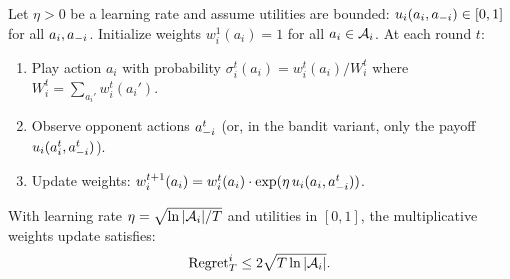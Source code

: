 \documentclass[11pt,a4paper]{article}
\begin{document}
\begin{definition}
\label{def:mwu}
Let $\eta > 0$ be a learning rate and assume utilities are bounded:
$u_i(a_i, a_{-i}) \in [0, 1]$ for all $a_i, a_{-i}$.
Initialize weights $w_i^1(a_i) = 1$ for all $a_i \in \mathcal{A}_i$.
At each round $t$:
\begin{enumerate}[nosep]
  \item Play action $a_i$ with probability
    $\sigma_i^t(a_i) = w_i^t(a_i) / W_i^t$ where
    $W_i^t = \sum_{a_i'} w_i^t(a_i')$.
  \item Observe opponent actions $a_{-i}^t$ (or, in the bandit
    variant, only the payoff $u_i(a_i^t, a_{-i}^t)$).
  \item Update weights:
    $w_i^{t+1}(a_i) = w_i^t(a_i) \cdot
    \exp(\eta \, u_i(a_i, a_{-i}^t))$.
\end{enumerate}
\end{definition}

\begin{theorem}
\label{thm:mwu-regret}
With learning rate $\eta = \sqrt{\ln |\mathcal{A}_i| / T}$ and utilities
in $[0, 1]$, the multiplicative weights update satisfies:
\begin{equation}
\label{eq:mwu-regret-bound}
  \mathrm{Regret}_T^i \leq 2\sqrt{T \ln |\mathcal{A}_i|}.
\end{equation}
\end{theorem}
\end{document}
